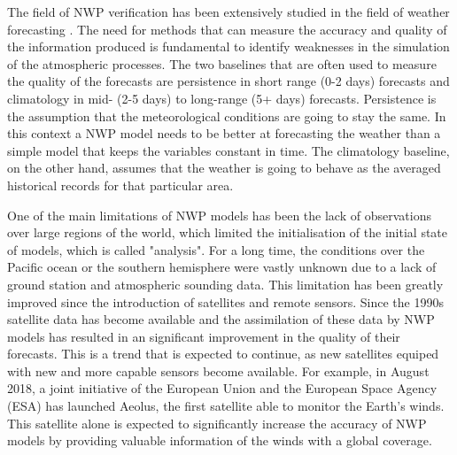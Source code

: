 The field of NWP verification has been extensively studied in the field of weather forecasting \citep{ahijevych2009application}. The need for methods that can measure the accuracy and quality of the information produced is fundamental to identify weaknesses in the simulation of the atmospheric processes. The two baselines that are often used to measure the quality of the forecasts are persistence in short range (0-2 days) forecasts and climatology in mid- (2-5 days) to long-range (5+ days) forecasts. Persistence is the assumption that the meteorological conditions are going to stay the same. In this context a NWP model needs to be better at forecasting the weather than a simple model that keeps the variables constant in time. The climatology baseline, on the other hand, assumes that the weather is going to behave as the averaged historical records for that particular area.

\medskip

One of the main limitations of NWP models has been the lack of observations over large regions of the world, which limited the initialisation of the initial state of models, which is called "analysis". For a long time, the conditions over the Pacific ocean or the southern hemisphere were vastly unknown due to a lack of ground station and atmospheric sounding data. This limitation has been greatly improved since the introduction of satellites and remote sensors. Since the 1990s satellite data has become available and the assimilation of these data by NWP models has resulted in an significant improvement in the quality of their forecasts. This is a trend that is expected to continue, as new satellites equiped with new and more capable sensors become available. For example, in August 2018, a joint initiative of the European Union and the European Space Agency (ESA) has launched Aeolus, the first satellite able to monitor the Earth's winds. This satellite alone is expected to significantly increase the accuracy of NWP models by providing valuable information of the winds with a global coverage.

\medskip

